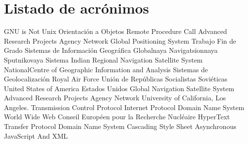 \chapter{Listado de acrónimos}

{\small
\begin{acronym}[XXXXXXXX]
  		{\acs{GNU} is Not Unix}
  			{Orientación a Objetos}
  		{Remote Procedure Call}
  	{Advanced Research Projects Agency Network}
  		{Global Positioning System}
  		{Trabajo Fin de Grado}
  		{Sistemas de Información Geográfica}
  	{Globalnaya Navigatsionnaya Sputnikovaya Sistema}
  		{Indian Regional Navigation Satellite System}
  		{NationalCentre of Geographic Information and Analysis}
  			{Sistemas de Geolocalización}
  		{Royal Air Force}
  		{Unión de Repúblicas Socialistas Soviéticas}
  		{United States of America}
  		{Estados Unidos}
  		{Global Navigation Satellite System}
  	{Advanced Research Projects Agency Network}
  		{University of California, Los Angeles}.
  		{Transmission Control Protocol}
  			{Internet Protocol}
  		{Domain Name System}
  		{World Wide Web}
  		{Conseil Européen pour la Recherche Nucléaire}
  		{HyperText Transfer Protocol}
  		{Domain Name System}
  		{Cascading Style Sheet}
  		{Asynchronous JavaScript And XML}
\end{acronym}
}





